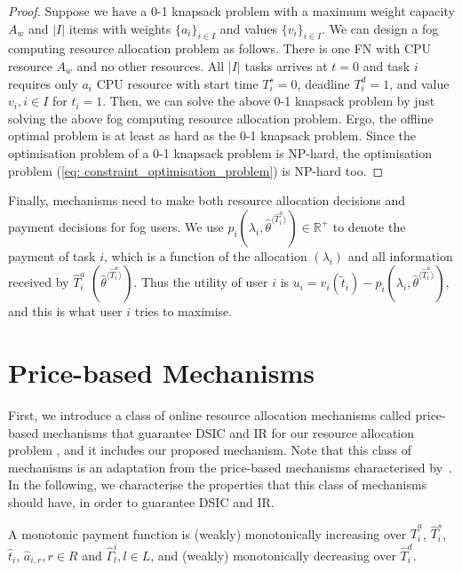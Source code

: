 \documentclass[11pt]{phdthesis}
\begin{document}
\begin{proof}
    Suppose we have a 0-1 knapsack problem with a maximum weight capacity $ A_w $ and $ |I| $ items with weights $ \{ a_i \}_{i \in I} $ and values $ \{ v_i \}_{i \in I} $. We can design a fog computing resource allocation problem as follows. There is one FN with CPU resource $ A_w $ and no other resources. All $ |I| $ tasks arrives at $ t = 0 $ and task $ i $ requires only $  a_i $ CPU resource with start time $ T_i^s = 0 $, deadline $ T_i^d = 1 $, and value $ v_i, i \in I $ for $ t_i=1 $. Then, we can solve the above 0-1 knapsack problem by just solving the above fog computing resource allocation problem. Ergo, the offline optimal problem is at least as hard as the 0-1 knapsack problem. Since the optimisation problem of a 0-1 knapsack problem is NP-hard, the optimisation problem (\ref{eq: constraint_optimisation_problem}) is NP-hard too.
\end{proof}

Finally, mechanisms need to make both resource allocation decisions and payment decisions for fog users. We use $p_i(\lambda_i, \hat{\theta}^{\langle \hat{T}_i^a \rangle}) \in \mathbb{R}^+ $ to denote the payment of task $i$, which is a function of the allocation $ ( \lambda_i ) $ and all information received by $ \hat{T}_i^a $ $ ( \hat{\theta}^{\langle \hat{T}_i^a \rangle}) $. Thus the utility of user $ i $ is $ u_i = v_i(\tilde{t}_i) - p_i(\lambda_i, \hat{\theta}^{\langle \hat{T}_i^a \rangle})$, and this is what user $ i $ tries to maximise.

\section{Price-based Mechanisms} \label{price-based mechanisms}

First, we introduce a class of online resource allocation mechanisms called price-based mechanisms that guarantee DSIC and IR for our resource allocation problem , and it includes our proposed mechanism. Note that this class of mechanisms is an adaptation from the price-based mechanisms characterised by~\citet{hayakawa2018price}. In the following, we characterise the properties that this class of mechanisms should have, in order to guarantee DSIC and IR.

\begin{definition}\label{df: monotonicity}
    A monotonic payment function is (weakly) monotonically increasing over $\hat{T}_i^a$, $\hat{T}_i^s$, $ \hat{t}_i $, $ \hat{a}_{i,r}, r \in R $ and $  \hat{\Gamma}_l^i, l \in L $, and (weakly) monotonically decreasing over $\hat{T}_i^d$.
\end{definition}
\end{document}
